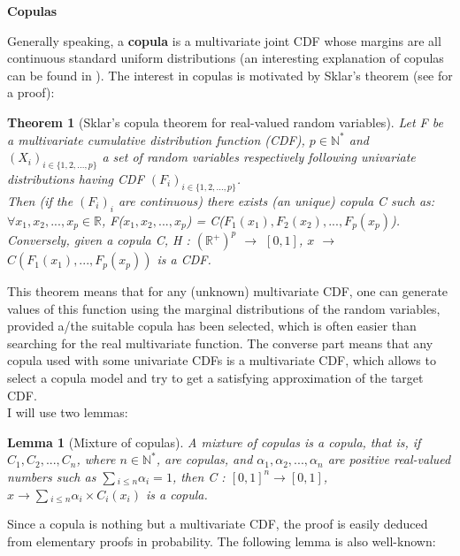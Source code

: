 \documentclass{report}
\newtheorem{lemma}{Lemma}[section]
\newtheorem{theorem}{Theorem}[section]
\begin{document}
{\bigskip
\noindent \textbf{Copulas}
\bigskip

Generally speaking, a \textbf{copula}\cite{sklar1959fonctions} is a multivariate joint CDF whose margins are all continuous standard uniform distributions (an interesting explanation of copulas can be found in \cite{modellingcopulas}). The interest in copulas is motivated by Sklar's theorem\cite{sklar1959fonctions} (see \cite{carley2002new} for a proof):

\begin{theorem}[Sklar's copula theorem for real-valued random variables]\label{sklartheorem}{Let F be a multivariate cumulative distribution function (CDF), $p \in \mathbb{N}^*$ and $(X_i)_{i \in \{1, 2, ..., p\}}$ a set of random variables respectively following univariate distributions having CDF $(F_i)_{i \in \{1, 2, ..., p\}}$.\\

Then (if the $(F_i)_i$ are continuous) there exists (an unique) copula C such as: $\forall x_1, x_2, ..., x_p \in \mathbb{R}$, F($x_1, x_2, ..., x_p$) = C($F_1(x_1), F_2(x_2), ..., F_p(x_p)$).\\

Conversely, given a copula C, H : $(\mathbb{R}^+)^p$ $\rightarrow$ $[0,1]$, $x$ $\rightarrow$ $C(F_1(x_1), ..., F_p(x_p))$ is a CDF.}\end{theorem}

This theorem means that for any (unknown) multivariate CDF, one can generate values of this function using the marginal distributions of the random variables, provided a/the suitable copula has been selected, which is often easier than searching for the real multivariate function. The converse part means that any copula used with some univariate CDFs is a multivariate CDF, which allows to select a copula model and try to get a satisfying approximation of the target CDF.\\

I will use two lemmas:

\begin{lemma}[Mixture of copulas]\label{mixtureofcopulas}{A mixture of copulas is a copula, that is, if $C_1, C_2, ..., C_n$, where $n \in \mathbb{N}^*$, are copulas, and $\alpha_1, \alpha_2, ..., \alpha_n$ are positive real-valued numbers such as $\sum{_{i \leq n}}{\alpha_i} = 1$, then C : $[0,1]^n \rightarrow [0,1]$, $x \rightarrow \sum{_{i \leq n}}{\alpha_i \times C_i(x_i)}$ is a copula.}\end{lemma}

Since a copula is nothing but a multivariate CDF, the proof is easily deduced from elementary proofs in probability. The following lemma is also well-known:

}
\end{document}
